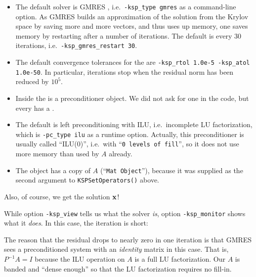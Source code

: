 \begin{itemize}
\item The default \pKSP solver is GMRES \citep{Saad2003}, i.e.~\texttt{-ksp\_type gmres} as a command-line option.  As GMRES builds an approximation of the solution from the Krylov space by saving more and more vectors, and thus uses up memory, one saves memory by restarting after a number of iterations.  The default is every 30 iterations, i.e.~\texttt{-ksp\_gmres\_restart 30}.
\item The default convergence tolerances for the \pKSP are \texttt{-ksp\_rtol 1.0e-5 -ksp\_atol 1.0e-50}.  In particular, \pKSP iterations stop when the residual norm has been reduced by $10^5$.
\item Inside the \pKSP is a \pPC preconditioner object.  We did not ask for one in the code, but every \pKSP has a \pPC.
\item The default \pPC is left preconditioning with ILU, i.e.~incomplete LU factorization, which is \texttt{-pc\_type ilu} as a runtime option.  Actually, this preconditioner is usually called ``ILU($0$)'', i.e.~with ``\texttt{0 levels of fill}'', so it does not use more memory than used by $A$ already.
\item The \pPC object has a copy of $A$ (``\texttt{Mat Object}''), because it was supplied as the second argument to \texttt{KSPSetOperators()} above.
\end{itemize}
Also, of course, we get the solution $\mathbf{x}$!

While option \texttt{-ksp\_view} tells us what the solver \emph{is}, option \texttt{-ksp\_monitor} shows what it \emph{does}.  In this case, the \pKSP iteration is short:
The reason that the residual drops to nearly zero in one iteration is that GMRES sees a preconditioned system with an \emph{identity} matrix in this case.  That is, $P^{-1} A = I$ because the ILU operation on $A$ is a full LU factorization.  Our $A$ is banded and ``dense enough'' so that the LU factorization requires no fill-in.

